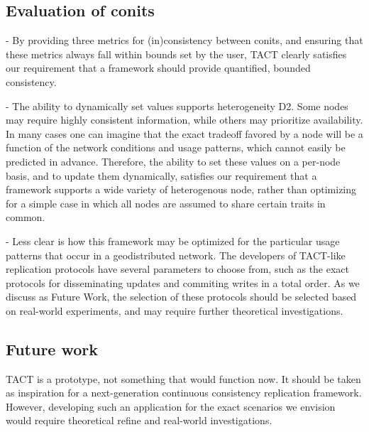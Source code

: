 \subsection{Evaluation of conits}

- By providing three metrics for (in)consistency between conits, and
  ensuring that these metrics always fall within bounds set by the
  user, TACT clearly satisfies our requirement that a framework should
  provide quantified, bounded consistency.

- The ability to dynamically set values supports heterogeneity
  D2. Some nodes may require highly consistent information, while
  others may prioritize availability. In many cases one can imagine
  that the exact tradeoff favored by a node will be a function of the
  network conditions and usage patterns, which cannot easily be
  predicted in advance. Therefore, the ability to set these values on
  a per-node basis, and to update them dynamically, satisfies our
  requirement that a framework supports a wide variety of heterogenous
  node, rather than optimizing for a simple case in which all nodes
  are assumed to share certain traits in common.

- Less clear is how this framework may be optimized for the particular
  usage patterns that occur in a geodistributed network. The
  developers of TACT-like replication protocols have several
  parameters to choose from, such as the exact protocols for
  disseminating updates and commiting writes in a total order. As we
  discuss as Future Work, the selection of these protocols should be
  selected based on real-world experiments, and may require further
  theoretical investigations.

\subsection{Future work}

TACT is a prototype, not something that would function now. It should
be taken as inspiration for a next-generation continuous consistency
replication framework. However, developing such an application for the
exact scenarios we envision would require theoretical refine and
real-world investigations.


